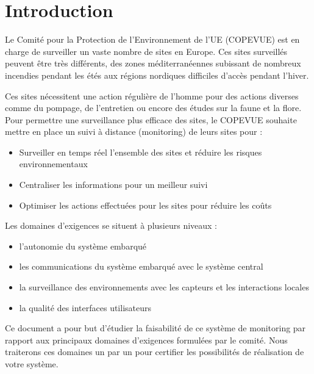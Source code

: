 \section{Introduction}

Le Comité pour la Protection de l'Environnement de l'UE (COPEVUE) est en charge de surveiller un vaste nombre de sites en Europe. Ces sites surveillés peuvent être très différents, des zones méditerranéennes subissant de nombreux incendies pendant les étés aux régions nordiques difficiles d'accès pendant l'hiver. 

Ces sites nécessitent une action régulière de l'homme pour des actions diverses comme du pompage, de l'entretien ou encore des études sur la faune et la flore. Pour permettre une surveillance plus efficace des sites, le COPEVUE souhaite mettre en place un suivi à distance (monitoring) de leurs sites pour : 

\begin{itemize}
\item Surveiller en temps réel l'ensemble des sites et réduire les risques environnementaux
\item Centraliser les informations pour un meilleur suivi
\item Optimiser les actions effectuées pour les sites pour réduire les coûts
\end{itemize}

Les domaines d'exigences se situent à plusieurs niveaux : 

\begin{itemize}
\item l'autonomie du système embarqué
\item les communications du système embarqué avec le système central
\item la surveillance des environnements avec les capteurs et les interactions locales
\item la qualité des interfaces utilisateurs
\end{itemize}

Ce document a pour but d'étudier la faisabilité de ce système de monitoring par rapport aux principaux domaines d'exigences formulées par le comité. Nous traiterons ces domaines un par un pour certifier les possibilités de réalisation de votre système.

\vfill
\pagebreak
